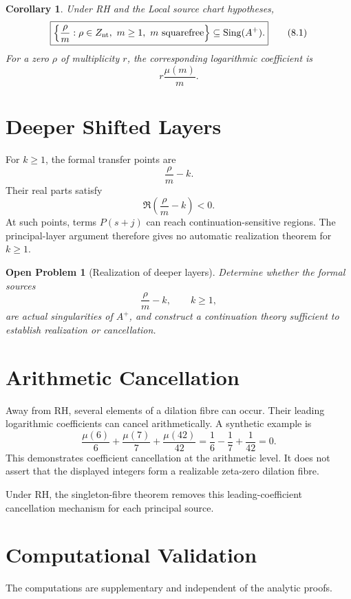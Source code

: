 \documentclass[11pt,a4paper]{article}
\newtheorem{corollary}[theorem]{Corollary}
\newtheorem{problem}[theorem]{Open Problem}
\theoremstyle{remark}
\newcommand{\Sing}{\operatorname{Sing}}
\begin{document}
\begin{corollary}
Under RH and the Local source chart hypotheses,
\[
\boxed{
\left\{\frac{\rho}{m}:\rho\in Z_{\rm nt},\ m\ge1,\ m\ \text{squarefree}\right\}
\subseteq \Sing(A^+).
}
\tag{8.1}
\]
For a zero $\rho$ of multiplicity $r$, the corresponding logarithmic coefficient is
\[
\boxed{r\frac{\mu(m)}m.}
\tag{8.2}
\]
\end{corollary}

\section{Deeper Shifted Layers}

For $k\ge1$, the formal transfer points are
\[
\boxed{\frac{\rho}{m}-k.}
\tag{9.1}
\]
Their real parts satisfy
\[
\Re\left(\frac{\rho}{m}-k\right)<0.
\]
At such points, terms $P(s+j)$ can reach continuation-sensitive regions. The principal-layer argument therefore gives no automatic realization theorem for $k\ge1$.

\begin{problem}[Realization of deeper layers]
Determine whether the formal sources
\[
\frac{\rho}{m}-k,\qquad k\ge1,
\]
are actual singularities of $A^+$, and construct a continuation theory sufficient to establish realization or cancellation.
\end{problem}

\section{Arithmetic Cancellation}

Away from RH, several elements of a dilation fibre can occur. Their leading logarithmic coefficients can cancel arithmetically. A synthetic example is
\[
\frac{\mu(6)}6+\frac{\mu(7)}7+\frac{\mu(42)}{42}
=\frac16-\frac17+\frac1{42}=0.
\tag{10.1}
\]
This demonstrates coefficient cancellation at the arithmetic level. It does not assert that the displayed integers form a realizable zeta-zero dilation fibre.

Under RH, the singleton-fibre theorem removes this leading-coefficient cancellation mechanism for each principal source.

\section{Computational Validation}

The computations are supplementary and independent of the analytic proofs.
\end{document}
